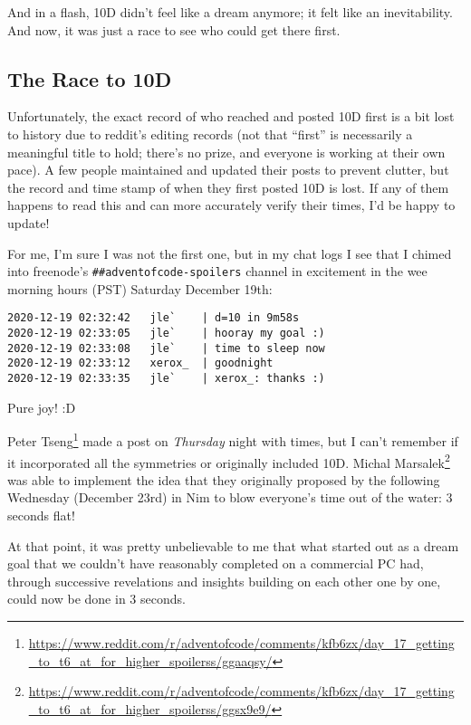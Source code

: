 \documentclass[]{article}
\renewcommand{\href}[2]{#2\footnote{\url{#1}}}
\begin{document}
And in a flash, 10D didn't feel like a dream anymore; it felt like an
inevitability. And now, it was just a race to see who could get there first.

\hypertarget{the-race-to-10d}{%
\subsection{The Race to 10D}\label{the-race-to-10d}}

Unfortunately, the exact record of who reached and posted 10D first is a bit
lost to history due to reddit's editing records (not that ``first'' is
necessarily a meaningful title to hold; there's no prize, and everyone is
working at their own pace). A few people maintained and updated their posts to
prevent clutter, but the record and time stamp of when they first posted 10D is
lost. If any of them happens to read this and can more accurately verify their
times, I'd be happy to update!

For me, I'm sure I was not the first one, but in my chat logs I see that I
chimed into freenode's \texttt{\#\#adventofcode-spoilers} channel in excitement
in the wee morning hours (PST) Saturday December 19th:

\begin{verbatim}
2020-12-19 02:32:42   jle`    | d=10 in 9m58s
2020-12-19 02:33:05   jle`    | hooray my goal :)
2020-12-19 02:33:08   jle`    | time to sleep now
2020-12-19 02:33:12   xerox_  | goodnight
2020-12-19 02:33:35   jle`    | xerox_: thanks :)
\end{verbatim}

Pure joy! :D

\href{https://www.reddit.com/r/adventofcode/comments/kfb6zx/day_17_getting_to_t6_at_for_higher_spoilerss/ggaaqsy/}{Peter
Tseng} made a post on \emph{Thursday} night with times, but I can't remember if
it incorporated all the symmetries or originally included 10D.
\href{https://www.reddit.com/r/adventofcode/comments/kfb6zx/day_17_getting_to_t6_at_for_higher_spoilerss/ggsx9e9/}{Michal
Marsalek} was able to implement the idea that they originally proposed by the
following Wednesday (December 23rd) in Nim to blow everyone's time out of the
water: 3 seconds flat!

At that point, it was pretty unbelievable to me that what started out as a dream
goal that we couldn't have reasonably completed on a commercial PC had, through
successive revelations and insights building on each other one by one, could now
be done in 3 seconds.
\end{document}
